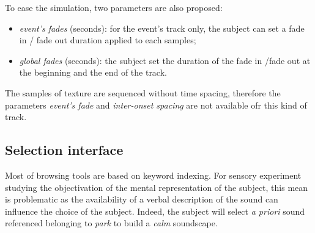 \documentclass[twoside,twocolumn]{article}
\begin{document}
To ease the simulation, two parameters are also proposed:


\begin{itemize}
\item \emph{event's fades} (seconds): for the event's track only, the subject can set a fade in / fade out duration applied to each samples;
\item \emph{global fades} (seconds): the subject set the duration of the fade in /fade out at the beginning and the end of the track.
\end{itemize}


The samples of texture are sequenced without time spacing, therefore the parameters \emph{event's fade} and \emph{inter-onset spacing} are not available ofr this kind of track.

\subsection{Selection interface}
\label{sec:simscene_ssf}



Most of browsing tools are based on keyword indexing. For sensory experiment studying the objectivation of the mental representation of the subject, this mean is problematic as the availability of a verbal description of the sound can influence the choice of the subject. Indeed, the subject will select \textit{a priori} sound referenced belonging to \emph{park} to build a \emph{calm} soundscape.
\end{document}
